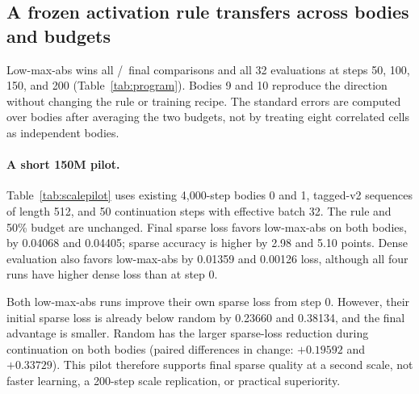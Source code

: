 \documentclass{article}
\begin{document}
\subsection{A frozen activation rule transfers across bodies and budgets}
\label{sec:program-results}
\begin{table}[H]
\centering
\caption{Low-max-abs minus exact-budget random after 200 steps under sparse
evaluation. Negative loss and positive accuracy differences favor low-max-abs.
``Fresh'' bodies were not used for rule selection. Mean rows use body-level
standard errors after averaging budgets within each body.}
\label{tab:program}
{\small\fixedprogramtable}
\end{table}

Low-max-abs wins all \ProgramFinalWins/\ProgramRegimes\ final comparisons and
all 32 evaluations at steps 50, 100, 150, and 200
(Table~\ref{tab:program}). Bodies 9 and 10 reproduce the direction without
changing the rule or training recipe. The standard errors are computed over
bodies after averaging the two budgets, not by treating eight correlated cells
as independent bodies.

\paragraph{A short 150M pilot.}
Table~\ref{tab:scalepilot} uses existing 4{,}000-step bodies 0 and 1,
tagged-v2 sequences of length 512, and 50 continuation steps with effective
batch 32. The rule and 50\% budget are unchanged. Final sparse loss favors
low-max-abs on both bodies, by 0.04068 and 0.04405; sparse accuracy is higher
by 2.98 and 5.10 points. Dense evaluation also favors low-max-abs by 0.01359
and 0.00126 loss, although all four runs have higher dense loss than at step 0.

Both low-max-abs runs improve their own sparse loss from step 0. However, their
initial sparse loss is already below random by 0.23660 and 0.38134, and the
final advantage is smaller. Random has the larger sparse-loss reduction during
continuation on both bodies (paired differences in change: $+0.19592$ and
$+0.33729$). This pilot therefore supports final sparse quality at a second
scale, not faster learning, a 200-step scale replication, or practical
superiority.

\begin{table}[H]
\centering
\caption{Fifty-step 150M pilot at 50\% activity. Differences are low-max-abs
minus paired random; accuracy differences are percentage points. Sparse loss
uses the training-time execution rule; dense loss restores all FFN rows. The
held-out set is newly generated.}
\label{tab:scalepilot}
{\footnotesize\setlength{\tabcolsep}{3pt}\scalepilotable}
\end{table}
\end{document}
